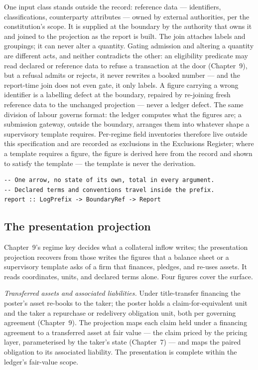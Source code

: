 One input class stands outside the record: reference data --- identifiers,
classifications, counterparty attributes --- owned by external authorities, per
the constitution's scope. It is supplied at the boundary by the authority that
owns it and joined to the projection as the report is built. The join attaches
labels and groupings; it can never alter a quantity. Gating admission and altering a
quantity are different acts, and neither contradicts the other: an eligibility predicate
may read declared or reference data to refuse a transaction at the door (Chapter~9), but a
refusal admits or rejects, it never rewrites a booked number --- and the report-time join
does not even gate, it only labels. A figure carrying a wrong
identifier is a labelling defect at the boundary, repaired by re-joining fresh
reference data to the unchanged projection --- never a ledger defect. The same
division of labour governs format: the ledger computes what the figures are; a
submission gateway, outside the boundary, arranges them into whatever shape a
supervisory template requires. Per-regime field inventories therefore live
outside this specification and are recorded as exclusions in the Exclusions
Register; where a template requires a figure, the figure is derived here from
the record and shown to satisfy the template --- the template is never the
derivation.

\begin{lstlisting}
-- One arrow, no state of its own, total in every argument.
-- Declared terms and conventions travel inside the prefix.
report :: LogPrefix -> BoundaryRef -> Report
\end{lstlisting}

\subsection{The presentation projection}

Chapter~9's regime key decides what a collateral inflow writes; the
presentation projection recovers from those writes the figures that a balance
sheet or a supervisory template asks of a firm that finances, pledges, and
re-uses assets. It reads coordinates, units, and declared terms alone. Four
figures cover the surface.

\emph{Transferred assets and associated liabilities.} Under title-transfer
financing the poster's asset re-books to the taker; the poster holds a
claim-for-equivalent unit and the taker a repurchase or redelivery obligation
unit, both per governing agreement (Chapter~9). The projection maps each claim
held under a financing agreement to a transferred asset at fair value --- the
claim priced by the pricing layer, parameterised by the taker's state
(Chapter~7) --- and maps the paired obligation to its associated liability. The
presentation is complete within the ledger's fair-value scope.

